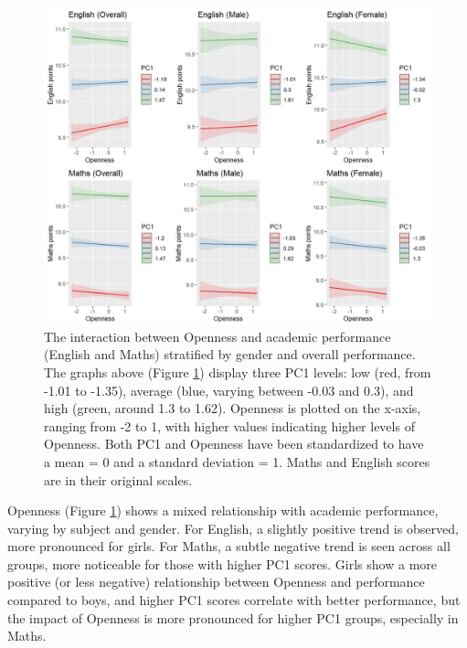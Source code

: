 \documentclass[12pt,a4paper,onecolumn]{article}
\numberwithin{equation}{section}
\begin{document}
\begin{figure}[ht] 
    \centering
    \includegraphics[width=1\linewidth]{AVE_TIPI_Open.JPG}
    \caption{The interaction between Openness and academic performance (English and Maths) stratified by gender and overall performance. The graphs above (Figure \ref{Fig9}) display three PC1 levels: low (red, from -1.01 to -1.35), average (blue, varying between -0.03 and 0.3), and high (green, around 1.3 to 1.62). Openness is plotted on the x-axis, ranging from -2 to 1, with higher values indicating higher levels of Openness. Both PC1 and Openness have been standardized to have a mean = 0 and a standard deviation = 1. Maths and English scores are in their original scales.}
    \label{Fig9}
\end{figure}

Openness (Figure \ref{Fig9}) shows a mixed relationship with academic performance, varying by subject and gender. For English, a slightly positive trend is observed, more pronounced for girls. For Maths, a subtle negative trend is seen across all groups, more noticeable for those with higher PC1 scores. Girls show a more positive (or less negative) relationship between Openness and performance compared to boys, and higher PC1 scores correlate with better performance, but the impact of Openness is more pronounced for higher PC1 groups, especially in Maths.
\end{document}
